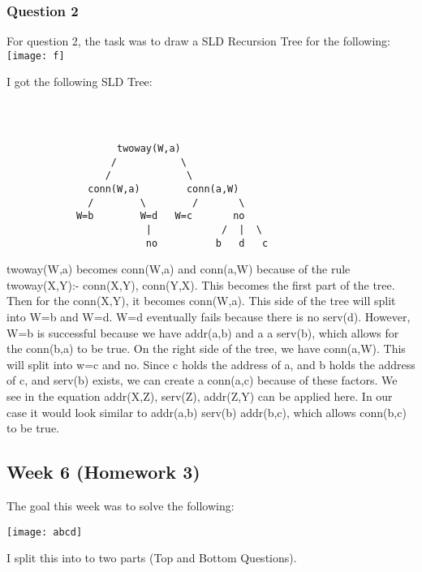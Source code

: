 \documentclass{article}
\theoremstyle{theorem}
\theoremstyle{definition}
\theoremstyle{remark}
\begin{document}
\subsubsection{Question 2}
For question 2, the task was to draw a SLD Recursion Tree for the following:\newline
\texttt{[image: f]}\newline\newline\newline

\noindent I got the following SLD Tree:
\begin{verbatim}



                   twoway(W,a)
                  /           \
                 /             \
              conn(W,a)        conn(a,W)
              /        \        /       \
            W=b        W=d   W=c       no
                        |            /  |  \
                        no          b   d   c
\end{verbatim}

\noindent\newline twoway(W,a) becomes conn(W,a) and conn(a,W) because of the rule twoway(X,Y):- conn(X,Y), conn(Y,X). This becomes the first part of the tree. Then for the conn(X,Y), it becomes conn(W,a). This side of the tree will split into W=b and W=d. W=d eventually fails because there is no serv(d). However, W=b is successful because we have addr(a,b) and a a serv(b), which allows for the conn(b,a) to be true. On the right side of the tree, we have conn(a,W). This will split into w=c and no. Since c holds the address of a, and b holds the address of c, and serv(b) exists, we can create a conn(a,c) because of these factors. We see in the equation addr(X,Z), serv(Z), addr(Z,Y) can be applied here. In our case it would look similar to addr(a,b) serv(b) addr(b,c), which allows conn(b,c) to be true.


\subsection{Week 6 (Homework 3)}
\noindent\newline The goal this week was to solve the following:

\texttt{[image: abcd]}\noindent\newline

\noindent\newline I split this into to two parts (Top and Bottom Questions).
\end{document}
